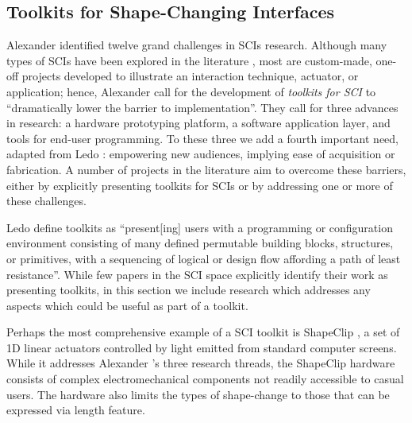     \subsection{Toolkits for Shape-Changing Interfaces}
      Alexander \etal \cite{10.1145/3173574.3173873} identified twelve grand
      challenges in SCIs research. Although many types of SCIs have been
      explored in the literature \cite{Sturdee:2018ce}, most are custom-made,
      one-off projects developed to illustrate an interaction technique,
      actuator, or application; hence, Alexander \etal
      \cite{10.1145/3173574.3173873} call for the development of
      \textit{toolkits for SCI} to ``dramatically lower the barrier to
      implementation''. They call for three advances in research: a hardware
      prototyping platform, a software application layer, and tools for end-user
      programming. To these three we add a fourth important need, adapted from
      Ledo \etal \cite{10.1145/3173574.3173610}: empowering new audiences,
      implying ease of acquisition or fabrication. A number of projects in the
      literature aim to overcome these barriers, either by explicitly presenting
      toolkits for SCIs or by addressing one or more of these challenges.
      
      Ledo \etal \cite{10.1145/3173574.3173610} define toolkits as
      ``present[ing] users with a programming or configuration environment
      consisting of many defined permutable building blocks, structures, or
      primitives, with a sequencing of logical or design flow affording a path
      of least resistance''. While few papers in the SCI space explicitly
      identify their work as presenting toolkits, in this section we include
      research which addresses any aspects which could be useful as part of a
      toolkit.
      
      Perhaps the most comprehensive example of a SCI toolkit is ShapeClip
      \cite{Hardy:2015dx}, a set of 1D linear actuators controlled by light
      emitted from standard computer screens. While it addresses Alexander
      \etal's three research threads, the ShapeClip hardware consists of complex
      electromechanical components not readily accessible to casual users. The
      hardware also limits the types of shape-change to those that can be
      expressed via length feature.
      
